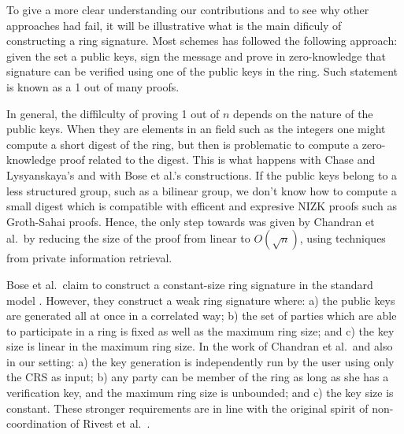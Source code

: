
To give a more clear understanding our contributions and to see why other approaches had fail, it will be illustrative what is the main dificuly of constructing a ring signature. Most schemes has followed the following approach: given the set a public keys, sign the message and prove in zero-knowledge that signature can be verified using one of the public keys in the ring. Such statement is known as a 1 out of many proofs.

In general, the diffilculty of proving 1 out of $n$ depends on the nature of the public keys. When they are elements in an field such as the integers one might compute a short digest of the ring, but then is problematic to compute a zero-knowledge proof related to the digest. This is what happens with Chase and Lysyanskaya's and with Bose et al.'s constructions. If the public keys belong to a less structured group, such as a bilinear group, we don't know how to compute a small digest which is compatible with efficent and expresive NIZK proofs such as Groth-Sahai proofs. Hence, the only step towards was given by Chandran et al.~by reducing the size of the proof from linear to $O(\sqrt{n})$, using techniques from private information retrieval.

Bose et al.~claim to construct a constant-size ring signature in the standard model \cite{ACISP:BosDasRan15}. However, they construct a weak ring signature where: a) the public keys are generated all at once in a correlated way; b) the set of parties which are able to participate in a ring is fixed as well as the maximum ring size; and c) the key size is linear in the maximum ring size. In the work of Chandran et al.~and also in our setting: a) the key generation is independently run by the user using only the CRS as input; b) any party can be member of the ring as long as she has a verification key, and the maximum ring size is unbounded; and c) the key size is constant. These stronger requirements are in line with the original spirit of {non-coordination} of  Rivest et al.~\cite{AC:RivShaTau01}.

